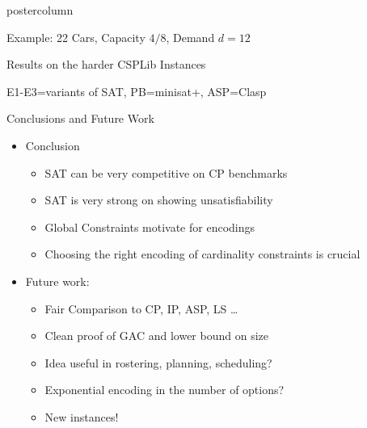\documentclass[final]{beamer}
\begin{document}
\begin{frame}
\begin{columns}
\begin{column}{.49\textwidth}
\begin{beamercolorbox}[center,wd=\textwidth]{postercolumn}
\begin{minipage}[T]{.95\textwidth}
{\begin{block}{Example: 22 Cars, Capacity $4/8$, Demand $d=12$}
                
            \end{block}
            \vfill
            \begin{block}{Results on the harder CSPLib Instances}
                \begin{center}
                
                \end{center}
                    E1-E3=variants of SAT, PB=minisat+, ASP=Clasp
            \end{block}
            \vfill
            \begin{block}{Conclusions and Future Work}
                \begin{itemize}
                \item Conclusion
                    \begin{itemize}
                    \itemsep1pt\parskip0pt
                    \item
                      SAT can be very competitive on CP benchmarks
                    \item
                      SAT is very strong on showing unsatisfiability
                    \item
                      Global Constraints motivate for encodings
                    \item
                      Choosing the right encoding of cardinality constraints is crucial
                    \end{itemize}
                \item Future work:
                    \begin{itemize}
                    \itemsep1pt\parskip0pt
                    \item
                      Fair Comparison to CP, IP, ASP, LS \ldots
                    \item
                      Clean proof of GAC and lower bound on size
                    \item
                      Idea useful in rostering, planning, scheduling?
                    \item
                      Exponential encoding in the number of options?
                    \item
                      New instances!
                    \end{itemize}
                \end{itemize}
            \end{block}
            \vfill
}
\end{minipage}
\end{beamercolorbox}
\end{column}
\end{columns}
\end{frame}
\end{document}
